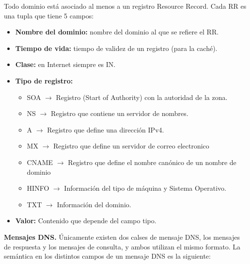 \documentclass[a4paper,11pt]{article}
\begin{document}
Todo dominio está asociado al menos a un registro Resource Record. Cada RR es una tupla que tiene 5 campos:

\begin{itemize}
\item \textbf{Nombre del dominio:} nombre del dominio al que se refiere el RR.
\item \textbf{Tiempo de vida:} tiempo de validez de un registro (para la caché).
\item \textbf{Clase:} en Internet siempre es IN.
\item \textbf{Tipo de registro:}
	\begin{itemize}
		\item SOA $\rightarrow$ Registro (Start of Authority) con la autoridad de la zona.
		\item NS $\rightarrow$ Registro que contiene un servidor de nombres.
		\item A $\rightarrow$ Registro que define una dirección IPv4.
		\item MX $\rightarrow$ Registro que define un servidor de correo electronico
		\item CNAME $\rightarrow$ Registro que define el nombre canónico de un nombre de dominio
		\item HINFO $\rightarrow$ Información del tipo de máquina y Sistema Operativo.
		\item TXT $\rightarrow$ Información del dominio.
	\end{itemize}
\item \textbf{Valor:} Contenido que depende del campo tipo.
\end{itemize}

\textbf{Mensajes DNS.} Únicamente existen dos calses de mensaje DNS, los mensajes de respuesta y los mensajes de consulta, y ambos utilizan el mismo formato. La semántica en los distintos campos de un mensaje DNS es la siguiente:
\end{document}
